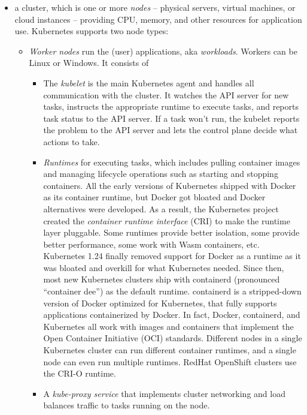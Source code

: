 \documentclass[8pt, table, xcdraw]{article}%
\begin{document}
\begin{itemize}
	\item a cluster, which is one or more \emph{nodes} -- physical servers, virtual machines, or cloud instances -- providing CPU, memory, and other resources for application use. Kubernetes supports two node types:

	\begin{itemize}
		\item \emph{Worker nodes} run the (user) applications, aka \emph{workloads}. Workers can be Linux or Windows. It consists of
		
		\begin{itemize}
			\item The \emph{kubelet} is the main Kubernetes agent and handles all communication with the cluster. It watches the API server for new tasks, instructs the appropriate runtime to execute tasks, and reports task status to the API server. If a task won’t run, the kubelet reports the problem to the API server and lets the control plane decide what actions to take.
			\item \emph{Runtimes} for executing tasks, which includes pulling container images and managing lifecycle operations such as starting and stopping containers. All the early versions of Kubernetes shipped with Docker as its container runtime, but Docker got bloated and Docker alternatives were developed. As a result, the Kubernetes project created the \emph{container runtime interface} (CRI) to make the runtime layer pluggable. Some runtimes provide better isolation, some provide better performance, some work with Wasm containers, etc. Kubernetes 1.24 finally removed support for Docker as a runtime as it was bloated and overkill for what Kubernetes needed. Since then, most new Kubernetes clusters ship with containerd (pronounced “container dee”) as the default runtime. containerd is a stripped-down version of Docker optimized for Kubernetes, that fully supports applications containerized by Docker. In fact, Docker, containerd, and Kubernetes all work with images and containers that implement the Open Container Initiative (OCI) standards. Different nodes in a single Kubernetes cluster can run different container runtimes, and a single node can even run multiple runtimes. RedHat OpenShift clusters use the CRI-O runtime.
			\item A \emph{kube-proxy service} that implements cluster networking and load balances traffic to tasks running on the node.
		\end{itemize}
		

\end{itemize}
\end{itemize}
\end{document}
